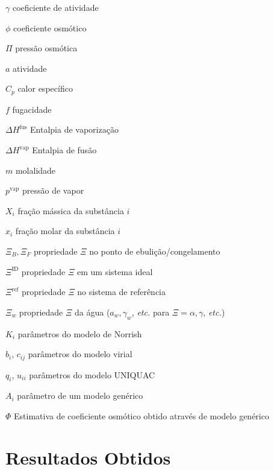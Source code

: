 \documentclass[
	12pt,				%
	openright,
	twoside,
	a4paper,			%
	english,			%
	french,				%
	brazil				%
	]{abntex2}
\begin{document}
\begin{simbolos}
	\item[$ \gamma $] coeficiente de atividade
	\item[$ \phi $] coeficiente osmótico
	\item[$ \Pi $] pressão osmótica
	\item[$ a $] atividade
	\item[$ C_p $] calor específico
	\item[$ f $] fugacidade
	\item[$ \Delta H^\text{fus} $] Entalpia de vaporização
	\item[$ \Delta H^\text{vap} $] Entalpia de fusão
	\item[$ m $] molalidade
	\item[$ p^\text{vap} $] pressão de vapor
	\item[$ X_i $] fração mássica da substância $i$
	\item[$ x_i $] fração molar da substância $i$
	\item[$ \Xi_B, \Xi_F $] propriedade $\Xi$ no ponto de ebulição/congelamento
	\item[$ \Xi^\text{ID} $] propriedade $\Xi$ em um sistema ideal
	\item[$ \Xi^\text{ref} $] propriedade $\Xi$ no sistema de referência
	\item[$ \Xi_w $] propriedade $\Xi$ da água ($a_w, \gamma_w$, \textit{etc.} %
		para $\Xi = \alpha, \gamma$, \textit{etc.})
	\item[$K_i$] parâmetros do modelo de Norrish
	\item[$b_i$, $c_{ij}$] parâmetros do modelo virial
	\item[$q_i$, $u_{ii}$] parâmetros do modelo UNIQUAC
	\item[$A_i$] parâmetro de um modelo genérico
	\item[$\Phi$] Estimativa de coeficiente osmótico obtido através de %
		modelo genérico
\end{simbolos}

\tableofcontents*
\cleardoublepage

\textual







\part{Resultados Obtidos}









\postextual

\nocite{nocedal2006}


\begin{anexosenv}



\end{anexosenv}

\printindex
\end{document}
